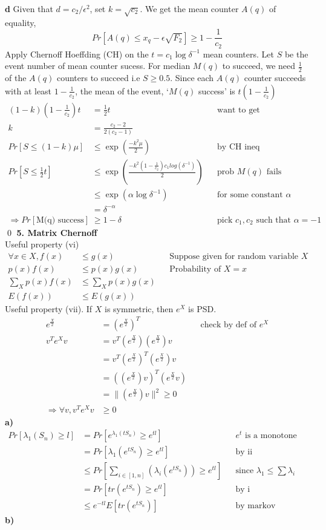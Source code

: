 \documentclass[11pt]{article}
\newcommand{\qpart}[1]{\vspace{0.1cm}\textbf{#1}\\ }
\begin{document}
\newpage
\textbf{d}
Given that $d = c_2/\epsilon^2$, set $k=\sqrt{c_2}$. We get the mean counter $A(q)$ of equality,
$$Pr[A(q) \leq x_q - \epsilon \sqrt{F_2}] \geq 1-\frac{1}{c_2}$$
Apply Chernoff Hoeffding (CH) on the $t=c_1 \log \delta^{-1}$ mean counters. Let $S$ be the event number of mean counter sucess. For median $M(q)$ to succeed, we need $\frac{1}{2}$ of the $A(q)$ counters to succeed i.e $S \geq 0.5$. Since each $A(q)$ counter succeeds with at least $1-\frac{1}{c_2}$, the mean of the event, `$M(q)$ success' is $t(1-\frac{1}{c_2})$
\begin{align*}
(1-k)(1-\frac{1}{c_2})t &= \frac{1}{2}t && \text{want to get}\\
k &= \frac{c_2-2}{2(c_2-1)}\\
Pr[S\leq (1-k)\mu]  &\leq \exp(\frac{-k^2\mu}{2}) &&\text{by CH ineq} \\
Pr[S\leq \frac{1}{2}t ]  &\leq \exp(\frac{-k^2 (1-\frac{1}{c_2})c_1log(\delta^{-1}) }{2}) &&\text{prob $M(q)$ fails} \\
&\leq \exp(\alpha \log \delta^{-1}) &&\text{for some constant $\alpha$} \\
&= \delta^{-\alpha}\\
\Rightarrow Pr[\text{M(q) success}] &\geq 1-\delta && \text{pick $c_1, c_2$ such that $\alpha = -1$}
\end{align*}
\qed
\newpage
\qpart{5. Matrix Chernoff }
Useful property (vi)
\begin{align*}
\forall x\in X, f(x) &\leq g(x) && \text{Suppose given for random variable $X$ } \\
p(x) f(x) &\leq p(x) g(x) &&\text{Probability of $X=x$ }\\
\sum_X p(x) f(x) &\leq \sum_X p(x) g(x) \\
E(f(x)) & \leq E(g(x))
\end{align*}
Useful property (vii). If $X$ is symmetric, then $e^X$ is PSD.
\begin{align*}
e^{\frac{X}{2}} &= (e^{\frac{X}{2}})^T && \text{check by def of $e^X$} \\
v^T e^X v &= v^T (e^{\frac{X}{2}}) (e^{\frac{X}{2}}) v \\
&= v^T (e^{\frac{X}{2}})^T (e^{\frac{X}{2}}) v \\
&= ((e^{\frac{X}{2}})v)^T (e^{\frac{X}{2}} v) \\
&= \| (e^{\frac{X}{2}}) v \|^2 \geq 0 \\
\Rightarrow \forall v, v^T e^X v &\geq 0
\end{align*}
\textbf{a)}
\begin{align}
Pr[\lambda_1(S_n) \geq l] & = Pr[e^{\lambda_1(tS_n)} \geq e^{tl}] &&\text{$e^t$ is a monotone increasing map}\\
& = Pr[\lambda_1(e^{tS_n}) \geq e^{tl}]  &&\text{by ii}\\
&\leq Pr[\sum_{i\in [1,n]}(\lambda_i(e^{tS_n})) \geq e^{tl}]  &&\text{since $\lambda_1 \leq \sum \lambda_i$}\\
&= Pr[tr(e^{tS_n}) \geq e^{tl}] && \text{by i}\\
&\leq e^{-tl} E[tr(e^{tS_n})] && \text{by markov inequality}
\end{align}
\textbf{b)} 
\end{document}
